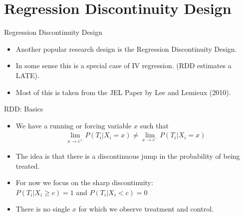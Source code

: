 \section{Regression Discontinuity Design}

\begin{frame}{Regression Discontinuity Design}
\begin{itemize}
\item Another popular research design is the \alert{Regression Discontinuity Design}.
\item In some sense this is a special case of IV regression. (RDD estimates a LATE).
\item Most of this is taken from the JEL Paper by Lee and Lemieux (2010).
\end{itemize}              
\end{frame}

\begin{frame}{RDD: Basics}
\begin{itemize}
\item We have a \alert{running or forcing variable} $x$ such that 
\begin{eqnarray*}
\lim_{x\rightarrow c^{+}} P(T_i | X_i = x) \neq \lim_{x\rightarrow c^{-}}P(T_i | X_i = x)
\end{eqnarray*}
\item The idea is that there is a \alert{discontinuous jump} in the \alert{probability of being treated}.
\item For now we focus on the \alert{sharp discontinuity}:\\
 $P(T_i | X_i \geq c) =1$ and $P(T_i | X_i < c) =0$
 \item There is no single $x$ for which we observe treatment and control.\\
\end{itemize}              
\end{frame}


